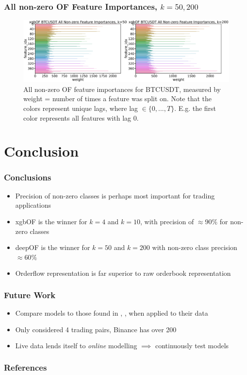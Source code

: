 \documentclass[handout]{beamer}
\begin{document}
\begin{frame}
    \frametitle{All non-zero OF Feature Importances, $k=50, 200$}
    \begin{figure}[htpb!]
        \centering
        \includegraphics[width=1.0\textwidth]{./images/xgboost_OF_BTCUSDT_all_feature_importances_2.pdf}
        \caption{All non-zero OF feature importances for BTCUSDT, measured by weight = number of times a feature was split on.
        Note that the colors represent unique lags, where lag $\in \{0, ..., T\} $. 
        E.g. the first color represents all features with lag 0.}
    \end{figure}
\end{frame}


\section{Conclusion}

\begin{frame}
    \frametitle{Conclusions}
     \begin{itemize}
        \item Precision of non-zero classes is perhaps most important for trading applications
        \item xgbOF is the winner for $k=4$ and $k=10$, with precision of $\approx 90\%$ for non-zero classes
        \item deepOF is the winner for $k=50$ and $k=200$ with non-zero class precision $\approx 60\%$
        \item Orderflow representation is far superior to raw orderbook representation
    \end{itemize}
    
\end{frame}

\begin{frame}
    \frametitle{Future Work}
     \begin{itemize}
         \item Compare models to those found in {\color{blue}\cite{ZHANG2019}}, {\color{blue}\cite{KOLM2023}}, {\color{blue}\cite{LUCCHESE2024}} when applied to their data
        \item Only considered 4 trading pairs, Binance has over 200
        \item Live data lends itself to \textit{online} modelling $\implies$ continuously test models
    \end{itemize}
    
\end{frame}

\begin{frame}[allowframebreaks]
        \frametitle{References}
        
\end{frame}

 
\end{document}
